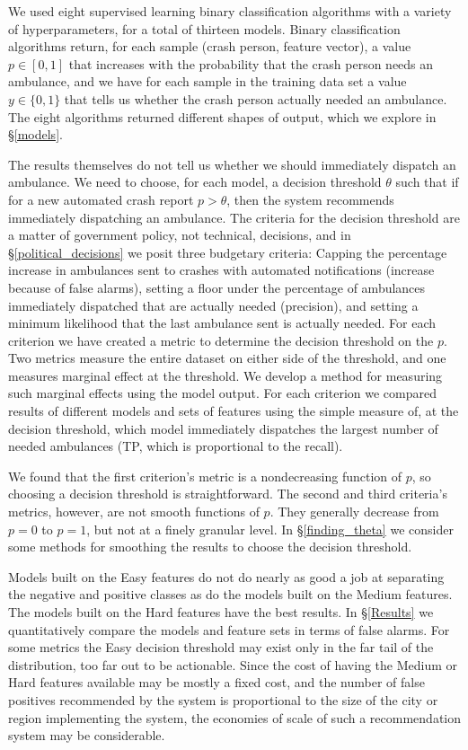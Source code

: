 We used eight supervised learning binary classification algorithms with a variety of hyperparameters, for a total of thirteen models.  Binary classification algorithms return, for each sample (crash person, feature vector), a value $p \in [0,1]$ that increases with the probability that the crash person needs an ambulance, and we have for each sample in the training data set a value $y \in \{0,1\}$ that tells us whether the crash person actually needed an ambulance.  The eight algorithms returned different shapes of output, which we explore in \S \ref{models}.

The results themselves do not tell us whether we should immediately dispatch an ambulance.  We need to choose, for each model, a decision threshold $\theta$ such that if for a new automated crash report $p>\theta$, then the system recommends immediately dispatching an ambulance.  The criteria for the decision threshold are a matter of government policy, not technical, decisions, and in \S \ref{political_decisions} we posit three budgetary criteria:  Capping the percentage increase in ambulances sent to crashes with automated notifications (increase because of false alarms), setting a floor under the percentage of ambulances immediately dispatched that are actually needed (precision), and setting a minimum likelihood that the last ambulance sent is actually needed.  For each criterion we have created a metric to determine the decision threshold on the $p$.  Two metrics measure the entire dataset on either side of the threshold, and one measures marginal effect at the threshold.  We develop a method for measuring such marginal effects using the model output. For each criterion we compared results of different models and sets of features using the simple measure of, at the decision threshold, which model immediately dispatches the largest number of needed ambulances (TP, which is proportional to the recall).  

We found that the first criterion's metric is a nondecreasing function of $p$, so choosing a decision threshold is straightforward.  The second and third criteria's metrics, however, are not smooth functions of $p$.  They generally decrease from $p=0$ to $p=1$, but not at a finely granular level.  In \S \ref{finding_theta} we consider some methods for smoothing the results to choose the decision threshold.  

Models built on the Easy features do not do nearly as good a job at separating the negative and positive classes as do the models built on the Medium features.  The models built on the Hard features have the best results.  In \S \ref{Results} we quantitatively compare the models and feature sets in terms of false alarms.  For some metrics the Easy decision threshold may exist only in the far tail of the distribution, too far out to be actionable.  Since the cost of having the Medium or Hard features available may be mostly a fixed cost, and the number of false positives recommended by the system is proportional to the size of the city or region implementing the system, the economies of scale of such a recommendation system may be considerable.  

